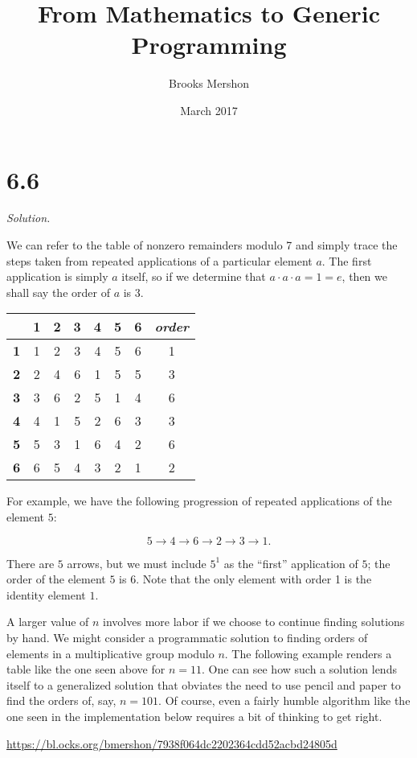 \documentclass{article}
\title{From Mathematics to Generic Programming}
\author{Brooks Mershon}
\date{March 2017}
\begin{document}
\maketitle

\section*{6.6}

\textit{Solution.}

We can refer to the table of nonzero remainders modulo 7 and simply trace the steps taken from repeated applications of a particular element $a$. The first application is simply $a$ itself, so if we determine that $a \cdot a \cdot a = 1 = e$, then we shall say the order of $a$ is $3$.

\begin{center}
\begin{tabular}{ c|c|c|c|c|c|c|c} 
 & \textbf{1} & \textbf{2} & \textbf{3} & \textbf{4} & \textbf{5} & \textbf{6} & \textit{order} \\
 \hline
 \textbf{1} & 1 & 2 & 3 & 4 & 5 & 6 & 1 \\ 
 \hline
 \textbf{2} & 2 & 4 & 6 & 1 & 5 & 5 & 3 \\ 
 \hline
 \textbf{3} & 3 & 6 & 2 & 5 & 1 & 4 & 6\\ 
 \hline
 \textbf{4} & 4 & 1 & 5 & 2 & 6 & 3 & 3\\ 
 \hline
 \textbf{5} & 5 & 3 & 1 & 6 & 4 & 2 & 6\\
 \hline
 \textbf{6} & 6 & 5 & 4 & 3 & 2 & 1 & 2\\
 \hline
\end{tabular}
\end{center}

For example, we have the following progression of repeated applications of the element $5$:

$$5 \rightarrow 4 \rightarrow 6 \rightarrow 2 \rightarrow 3 \rightarrow 1.$$

There are $5$ arrows, but we must include $5^1$ as the ``first'' application of $5$; the order of the element $5$ is $6$. Note that the only element with order 1 is the identity element $1$.

A larger value of $n$ involves more labor if we choose to continue finding solutions by hand. We might consider a programmatic solution to finding orders of elements in a multiplicative group modulo $n$. The following example renders a table like the one seen above for $n = 11$. One can see how such a solution lends itself to a generalized solution that obviates the need to use pencil and paper to find the orders of, say, $n = 101$. Of course, even a fairly humble algorithm like the one seen in the implementation below requires a bit of thinking to get right.

\bigskip

\url{https://bl.ocks.org/bmershon/7938f064dc2202364cdd52acbd24805d}
\end{document}
